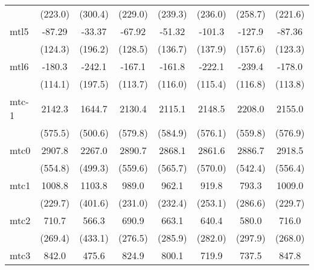 \documentclass{article}
\begin{document}
{\begin{longtable}{l*{7}{c}}
                &  (223.0)         &  (300.4)         &  (229.0)         &  (239.3)         &  (236.0)         &  (258.7)         &  (221.6)         \\
mtl5            &   -87.29         &   -33.37         &   -67.92         &   -51.32         &   -101.3         &   -127.9         &   -87.36         \\
                &  (124.3)         &  (196.2)         &  (128.5)         &  (136.7)         &  (137.9)         &  (157.6)         &  (123.3)         \\
mtl6            &   -180.3         &   -242.1         &   -167.1         &   -161.8         &   -222.1         &   -239.4\sym{*}  &   -178.0         \\
                &  (114.1)         &  (197.5)         &  (113.7)         &  (116.0)         &  (115.4)         &  (116.8)         &  (113.8)         \\
mtc-1           &   2142.3\sym{***}&   1644.7\sym{**} &   2130.4\sym{***}&   2115.1\sym{**} &   2148.5\sym{***}&   2208.0\sym{***}&   2155.0\sym{***}\\
                &  (575.5)         &  (500.6)         &  (579.8)         &  (584.9)         &  (576.1)         &  (559.8)         &  (576.9)         \\
mtc0            &   2907.8\sym{***}&   2267.0\sym{***}&   2890.7\sym{***}&   2868.1\sym{***}&   2861.6\sym{***}&   2886.7\sym{***}&   2918.5\sym{***}\\
                &  (554.8)         &  (499.3)         &  (559.6)         &  (565.7)         &  (570.0)         &  (542.4)         &  (556.4)         \\
mtc1            &   1008.8\sym{***}&   1103.8\sym{*}  &    989.0\sym{***}&    962.1\sym{***}&    919.8\sym{**} &    793.3\sym{**} &   1009.0\sym{***}\\
                &  (229.7)         &  (401.6)         &  (231.0)         &  (232.4)         &  (253.1)         &  (286.6)         &  (229.7)         \\
mtc2            &    710.7\sym{*}  &    566.3         &    690.9\sym{*}  &    663.1\sym{*}  &    640.4\sym{*}  &    580.0         &    716.0\sym{*}  \\
                &  (269.4)         &  (433.1)         &  (276.5)         &  (285.9)         &  (282.0)         &  (297.9)         &  (268.0)         \\
mtc3            &    842.0\sym{**} &    475.6         &    824.9\sym{**} &    800.1\sym{**} &    719.9\sym{*}  &    737.5\sym{*}  &    847.8\sym{**} \\

\end{longtable}}
\end{document}

